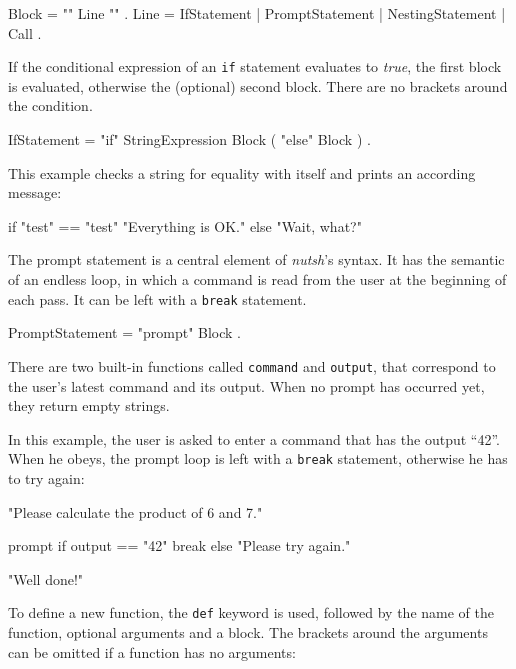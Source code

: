 \documentclass[paper=a4,twoside,abstract=on,cleardoublepage=empty,numbers=noenddot,toc=bib,12pt,appendixprefix=true]{scrreprt}
\begin{document}
\begin{ebnf}
Block = "{" { Line } "}" .
Line = IfStatement | PromptStatement | NestingStatement | Call .
\end{ebnf}


If the conditional expression of an \texttt{if} statement evaluates to \emph{true}, the first block is evaluated, otherwise the (optional) second block. There are no brackets around the condition.

\begin{ebnf}
IfStatement = "if" StringExpression Block ( "else" Block ) .
\end{ebnf}
%
This example checks a string for equality with itself and prints an according message:

\begin{nutsh}
if "test" == "test" {
    "Everything is OK."
} else {
    "Wait, what?"
}
\end{nutsh}


The prompt statement is a central element of \emph{nutsh}'s syntax. It has the semantic of an endless loop, in which a command is read from the user at the beginning of each pass. It can be left with a \texttt{break} statement.

\begin{ebnf}
PromptStatement = "prompt" Block .
\end{ebnf}
%
There are two built-in functions called \texttt{command} and \texttt{output}, that correspond to the user's latest command and its output. When no prompt has occurred yet, they return empty strings.

In this example, the user is asked to enter a command that has the output “42”. When he obeys, the prompt loop is left with a \texttt{break} statement, otherwise he has to try again:

\begin{nutsh}
"Please calculate the product of 6 and 7."

prompt {
    if output == "42" {
        break
    } else {
        "Please try again."
    }
}

"Well done!"
\end{nutsh}


To define a new function, the \texttt{def} keyword is used, followed by the name of the function, optional arguments and a block. The brackets around the arguments can be omitted if a function has no arguments:
\end{document}
